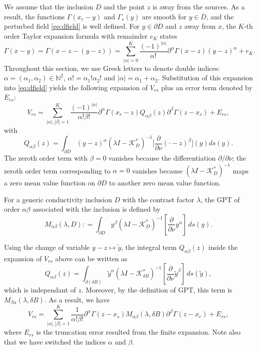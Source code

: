 We assume that the inclusion $D$ and the point $z$ is away from
the sources. As a result, the functions $\Gamma(x_r - y)$ and
$\Gamma_s(y)$ are smooth for $y \in \overline{D}$, and the
perturbed field \eqref{eq:dfield} is well defined. For $y \in
\partial D$ and $z$ away from $x$, the $K$-th order Taylor
expansion formula with remainder $e_K$ states
\begin{equation}
\Gamma(x - y) = \Gamma(x - z - (y-z)) = \sum_{|\alpha| = 0}^K
\frac{(-1)^{|\alpha|}}{\alpha!} \partial^{\alpha} \Gamma(x - z)
(y-z)^\alpha + e_K.
\end{equation}
Throughout this section, we use Greek letters to denote double
indices: $\alpha = (\alpha_1, \alpha_2) \in \mathbb{N}^2$,
$\alpha! = \alpha_1 ! \alpha_2 !$ and $|\alpha| = \alpha_1 +
\alpha_2$. Substitution of this expansion into \eqref{eq:dfield}
yields the following expansion of $V_{rs}$ plus an error term
denoted by $E_{rs}$:
\begin{equation*}
V_{rs}= \sum_{|\alpha|,|\beta|=1}^K \frac{(-1)^{|\alpha|}}{\alpha
! \beta !} \partial^\alpha \Gamma(x_r-z) Q_{\alpha\beta}(z)
\partial^\beta \Gamma(z-x_s) + E_{rs},
\end{equation*}
with
$$
Q_{\alpha\beta}(z)= \int_{\partial D} (y-z)^\alpha (\lambda I -
\mathcal{K}_D^*)^{-1} \bigg[\frac{\partial}{\partial \nu} (\cdot
-z)^\beta\bigg](y) ds(y).
$$
The zeroth order term with $\beta = 0$ vanishes because the
differentiation $\partial/\partial \nu$; the zeroth order term
corresponding to $\alpha = 0$ vanishes because $(\lambda I -
\mathcal{K}^*_D)^{-1}$ maps a zero mean value function on
$\partial D$ to another zero mean value function.

For a generic conductivity inclusion $D$ with the contrast factor
$\lambda$, the GPT of order $\alpha\beta$ associated with the
inclusion is defined by
\begin{equation}
M_{\alpha \beta}(\lambda, D) : = \int_{\partial D} y^\beta
(\lambda I - \mathcal{K}_{D}^*)^{-1}[\frac{\partial}{\partial \nu}
y^\alpha] \, ds(y). \label{eq:Mdef}
\end{equation}

Using the change of variable $y - z \mapsto \tilde{y}$, the
integral term $Q_{\alpha\beta}(z)$ inside the expansion of
$V_{rs}$ above can be written as
\begin{equation}
Q_{\alpha\beta}(z) = \int_{\partial (\delta B)} \tilde{y}^\alpha
(\lambda I - \mathcal{K}_{\delta
B}^*)^{-1}[\frac{\partial}{\partial \nu} \tilde{y}^\beta]\,
ds(\tilde{y}),
\end{equation}
which is independant of $z$. Moreover, by the definition of GPT,
this term is $M_{ \beta \alpha}(\lambda, \delta B)$. As a result,
we have\begin{equation} V_{rs} = \sum_{|\alpha|,|\beta|=1}^K
\frac{1}{\alpha ! \beta !}
\partial^\alpha \Gamma(z-x_s) M_{\alpha \beta}(\lambda, \delta B)
\partial^\beta \Gamma(z-x_r) + E_{rs}, \label{eq:Vrsexp}
\end{equation}
where $E_{rs}$ is the truncation error resulted from the finite
expansion. Note also that we have switched the indices $\alpha$
and $\beta$.


